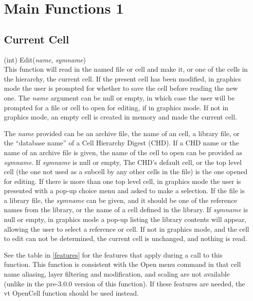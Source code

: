 \section{Main Functions 1}
\subsection{Current Cell}
\label{iffuncs}

\begin{description}
\item{(int) \vt Edit({\it name\/}, {\it symname\/})}\\
This function will read in the named file or cell and make it, or one
of the cells in the hierarchy, the current cell.  If the present cell
has been modified, in graphics mode the user is prompted for whether
to save the cell before reading the new one.  The {\it name} argument
can be null or empty, in which case the user will be prompted for a
file or cell to open for editing, if in graphics mode.  If not in
graphics mode, an empty cell is created in memory and made the current
cell.

The {\it name} provided can be an archive file, the name of an {\Xic}
cell, a library file, or the ``database name'' of a Cell Hierarchy
Digest (CHD).  If a CHD name or the name of an archive file is given,
the name of the cell to open can be provided as {\it symname\/}.  If
{\it symname} is null or empty, The CHD's default cell, or the top
level cell (the one not used as a subcell by any other cells in the
file) is the one opened for editing.  If there is more than one top
level cell, in graphics mode the user is presented with a pop-up
choice menu and asked to make a selection.  If the file is a library
file, the {\it symname} can be given, and it should be one of the
reference names from the library, or the name of a cell defined in the
library.  If {\it symname} is null or empty, in graphics mode a pop-up
listing the library contents will appear, allowing the user to select
a reference or cell.  If not in graphics mode, and the cell to edit
can not be determined, the current cell is unchanged, and nothing is
read.

See the table in \ref{features} for the features that apply during a
call to this function.  This function is consistent with the {\cb
Open} menu command in that cell name aliasing, layer filtering and
modification, and scaling are not available (unlike in the pre-3.0.0
version of this function).  If these features are needed, the {vt
OpenCell} function should be used instead.


\end{description}
